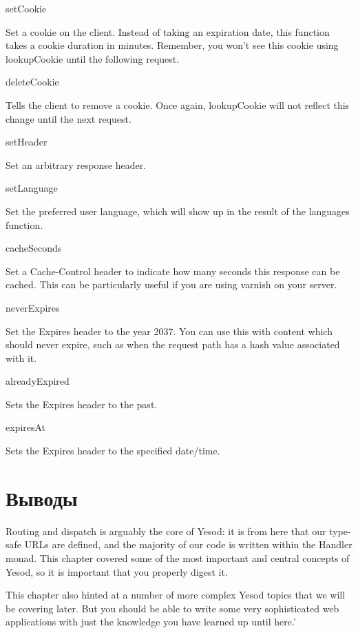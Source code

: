 setCookie

Set a cookie on the client. Instead of taking an expiration date, this
function takes a cookie duration in minutes. Remember, you won't see
this cookie using lookupCookie until the following request.

deleteCookie

Tells the client to remove a cookie. Once again, lookupCookie will not
reflect this change until the next request.

setHeader

Set an arbitrary response header.

setLanguage

Set the preferred user language, which will show up in the result of
the languages function.

cacheSeconds

Set a Cache-Control header to indicate how many seconds this response
can be cached. This can be particularly useful if you are using
varnish on your server.

neverExpires

Set the Expires header to the year 2037. You can use this with content
which should never expire, such as when the request path has a hash
value associated with it.

alreadyExpired

Sets the Expires header to the past.

expiresAt

Sets the Expires header to the specified date/time.

\section{Выводы}

Routing and dispatch is arguably the core of Yesod: it is from here
that our type-safe URLs are defined, and the majority of our code is
written within the Handler monad. This chapter covered some of the
most important and central concepts of Yesod, so it is important that
you properly digest it.

This chapter also hinted at a number of more complex Yesod topics that
we will be covering later. But you should be able to write some very
sophisticated web applications with just the knowledge you have
learned up until here.'
